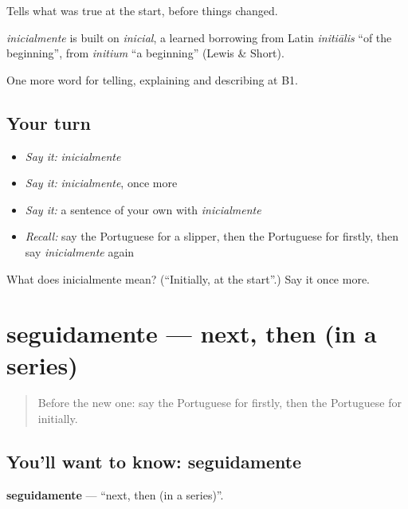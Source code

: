 Tells what was true at the start, before things changed.

\begin{cousinweb}
\emph{inicialmente} is built on \emph{inicial}, a learned borrowing from Latin \emph{initiālis} \textquotedblleft{}of the beginning\textquotedblright{}, from \emph{initium} \textquotedblleft{}a beginning\textquotedblright{} (Lewis \& Short).
\end{cousinweb}

\begin{grammarlens}[title={What you've built}]
One more word for telling, explaining and describing at B1.
\end{grammarlens}

\subsection*{Your turn}
\begin{itemize}
\raggedright
  \item \emph{Say it:} \emph{inicialmente}
  \item \emph{Say it:} \emph{inicialmente}, once more
  \item \emph{Say it:} a sentence of your own with \emph{inicialmente}
  \item \emph{Recall:} say the Portuguese for a slipper, then the Portuguese for firstly, then say \emph{inicialmente} again
\end{itemize}

\begin{tcolorbox}[breakable,colback=teal!4,colframe=teal!35!black,title={Before you move on}]
What does inicialmente mean? (\textquotedblleft{}Initially, at the start\textquotedblright{}.) Say it once more.
\end{tcolorbox}
\section[seguidamente]{seguidamente — next, then (in a series)}

\label{lesson:PT-C269-seguidamente}



\begin{quote}
Before the new one: say the Portuguese for firstly, then the Portuguese for initially.
\end{quote}

\subsection*{You'll want to know: seguidamente}
\textbf{seguidamente} — \textquotedblleft{}next, then (in a series)\textquotedblright{}.

